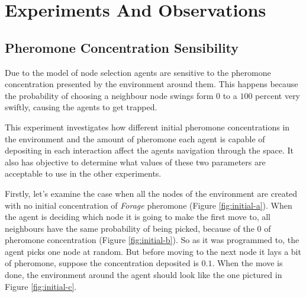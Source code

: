 \chapter{Experiments And Observations}
\label{ch:experiments-and-observations}

\section{Pheromone Concentration Sensibility}

Due to the model of node selection agents are sensitive to the pheromone concentration presented by the environment around them. This happens because the probability of choosing a neighbour node swings form $0$ to a $100$ percent very swiftly, causing the agents to get trapped.

This experiment investigates how different initial pheromone concentrations in the environment and the amount of pheromone each agent is capable of depositing in each interaction affect the agents navigation through the space. It also has objective to determine what values of these two parameters are acceptable to use in the other experiments.

Firstly, let's examine the case when all the nodes of the environment are created with no initial concentration of \emph{Forage} pheromone (Figure \ref{fig:initial-a}). When the agent is deciding which node it is going to make the first move to, all neighbours have the same probability of being picked, because of the $0$ of pheromone concentration (Figure \ref{fig:initial-b}). So as it was programmed to, the agent picks one node at random. But before moving to the next node it lays a bit of pheromone, suppose the concentration deposited is $0.1$. When the move is done, the environment around the agent should look like the one pictured in Figure \ref{fig:initial-c}.

